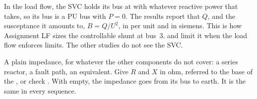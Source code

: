 


In the load flow, the SVC holds its bus at  with whatever reactive power that
takes, so its bus is a PU bus with $P = 0$. The results report that $Q$, and the
susceptance it amounts to, $B = Q/U^2$, in per unit and in siemens. This is how
Assignment LF sizes the controllable shunt at bus~3.  and  limit it
when the load flow enforces limits. The other studies do not see the SVC.




A plain impedance, for whatever the other components do not cover: a series reactor, a
fault path, an equivalent. Give $R$ and $X$ in ohm, referred to the base of the
, or check . With  empty, the impedance goes
from its bus to earth. It is the same in every sequence.


